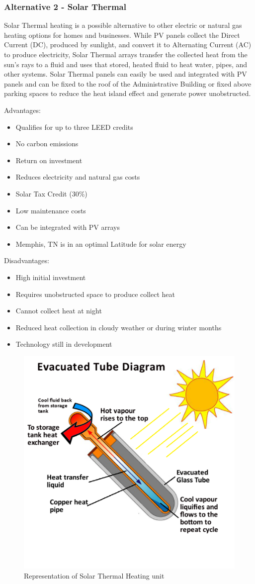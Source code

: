 \documentclass{ceri}
\begin{document}
\subsubsection{Alternative 2 - Solar Thermal}

Solar Thermal heating is a possible alternative to other electric or natural gas heating options for homes and businesses. While PV panels collect the Direct Current (DC), produced by sunlight, and convert it to Alternating Current (AC) to produce electricity, Solar Thermal arrays transfer the collected heat from the sun’s rays to a fluid and uses that stored, heated fluid to heat water, pipes, and other systems. Solar Thermal panels can easily be used and integrated with PV panels and can be fixed to the roof of the Administrative Building or fixed above parking spaces to reduce the heat island effect and generate power unobstructed.

Advantages:
\begin{itemize}
\item Qualifies for up to three LEED credits
\item No carbon emissions
\item Return on investment
\item Reduces electricity and natural gas costs
\item Solar Tax Credit (30\%)
\item Low maintenance costs
\item Can be integrated with PV arrays
\item Memphis, TN is in an optimal Latitude for solar energy
\end{itemize}
Disadvantages:
\begin{itemize}
\item High initial investment
\item Requires unobstructed space to produce collect heat
\item Cannot collect heat at night
\item Reduced heat collection in cloudy weather or during winter months
\item Technology still in development
\end{itemize}

\begin{figure}[H]
    \centering
    \includegraphics[width=.35\textwidth]{images/LEED2.png}
    \caption{Representation of Solar Thermal Heating unit}
    \label{fig:THU_LEED}
\end{figure}
\end{document}
